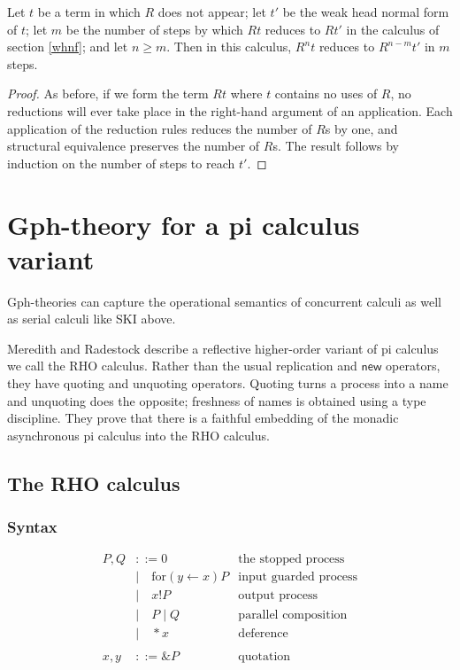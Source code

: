 \documentclass[a4paper,UKenglish]{lipics-v2016}
\newcommand{\new}{\mathsf{new}}
\newcommand{\for}{\mathrm{for }}
\newcommand{\from}{\leftarrow}
\begin{document}
\begin{theorem}
  Let $t$ be a term in which $R$ does not appear; let $t'$ be the weak head normal form of $t$; let $m$ be the number of steps by which $Rt$ reduces to $Rt'$ in the calculus of section \ref{whnf}; and let $n\ge m$.  Then in this calculus, $R^n t$ reduces to $R^{n-m}t'$ in $m$ steps.
\end{theorem}

\begin{proof}
As before, if we form the term $Rt$ where $t$ contains no uses of $R$, no reductions will ever take place in the right-hand argument of an application.  Each application of the reduction rules reduces the number of $R$s by one, and structural equivalence preserves the number of $R$s.  The result follows by induction on the number of steps to reach $t'.$
\end{proof}

\section{Gph-theory for a pi calculus variant}
\label{rhocomb}
Gph-theories can capture the operational semantics of concurrent calculi as well as serial calculi like SKI above.

  Meredith and Radestock \cite{DBLP:journals/entcs/MeredithR05} describe a reflective higher-order variant of pi calculus we call the RHO calculus.  Rather than the usual replication and $\new$ operators, they have quoting and unquoting operators.  Quoting turns a process into a name and unquoting does the opposite; freshness of names is obtained using a type discipline.  They prove that there is a faithful embedding of the monadic asynchronous pi calculus into the RHO calculus.

\subsection{The RHO calculus}
\subsubsection{Syntax}
\[\begin{array}{rlr}
  P, Q &::= 0 & \mbox{the stopped process}\\ 
  &| \quad \for(y \from x)P & \mbox{input guarded process} \\ 
  &| \quad x!P & \mbox{output process}\\ 
  &| \quad P \;|\; Q & \mbox{parallel composition}\\
  &| \quad *x & \mbox{deference}\\ 
  &\\
  x, y &::= \&P & \mbox{quotation}\\ 
\end{array}\]
\end{document}
